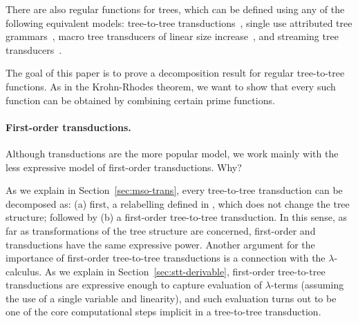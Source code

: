 There are also regular functions for trees, which can be defined using any of the following equivalent models: \mso tree-to-tree transductions~\cite[Section 3]{bloem_comparison_2000}, single use attributed tree grammars~\cite{bloem_comparison_2000}, macro tree transducers of linear size increase~\cite[Theorem 7.1]{engelfriet_macro_2003}, and streaming tree transducers~\cite[Theorem 4.6]{alur2017streaming}. 

The goal of this paper is to prove a decomposition result for regular tree-to-tree functions. As in the Krohn-Rhodes theorem, we want to show that every such function can be obtained by combining certain prime functions.  

\paragraph*{First-order transductions. } Although \mso transductions are the more popular model, we work mainly with the less expressive model of first-order transductions. Why?

As we explain in Section~\ref{sec:mso-trans}, every \mso tree-to-tree transduction can be decomposed as: (a) first, a relabelling defined in \mso, which does not change the tree structure; followed by (b) a first-order tree-to-tree transduction. In this sense, as far as transformations of the tree structure are concerned,  first-order and \mso transductions have the same expressive power. Another argument for the importance of first-order tree-to-tree transductions is a connection with the $\lambda$-calculus. As we explain in Section~\ref{sec:stt-derivable}, first-order tree-to-tree transductions are expressive enough to capture evaluation of $\lambda$-terms (assuming the use of a single variable and linearity), and such evaluation turns out to be one of the core computational steps implicit in a tree-to-tree transduction. 

